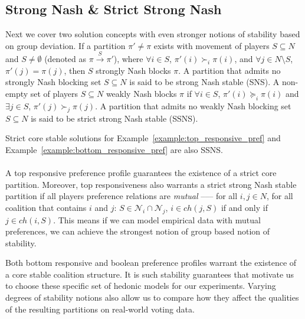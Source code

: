 \subsection{Strong Nash \& Strict Strong Nash}
\label{subsec:strong_nash_strict_strong_nash}
Next we cover two solution concepts with even stronger notions of stability
based on group deviation.
If a partition $\pi' \neq \pi$ exists with movement of players $S \subseteq N$
and $S \neq \emptyset$ (denoted as $\pi \xrightarrow{S} \pi'$), where
$\forall i \in S$, $\pi'(i) \succ_i \pi(i)$,
and $\forall j \in N\text{\textbackslash}S$, $\pi'(j) = \pi(j)$,
then $S$ strongly Nash blocks $\pi$.
A partition that admits no strongly Nash blocking set $S \subseteq N$ is said
to be strong Nash stable (SNS).
A non-empty set of players $S \subseteq N$ weakly Nash blocks $\pi$ if
$\forall i \in S$, $\pi'(i) \succeq_i \pi(i)$ and $\exists j \in S$,
$\pi'(j) \succ_j \pi(j)$.
A partition that admits no weakly Nash blocking set $S \subseteq N$ is said to
be strict strong Nash stable (SSNS).

Strict core stable solutions for Example~\ref{example:top_responsive_pref}
and Example~\ref{example:bottom_responsive_pref} are also SSNS.

\paragraph{}
A top responsive preference profile guarantees the existence of a strict core partition.
Moreover, top responsiveness also warrants a strict strong Nash stable partition
if all players preference relations are \textit{mutual} ––– for all $i, j \in N$,
for all coalition that contains $i$ and $j$:
$S \in \mathcal{N}_i \cap \mathcal{N}_j$, $i \in ch(j, S)$ if and only if
$j \in ch(i, S)$.
This means if we can model empirical data with mutual preferences,
we can achieve the strongest notion of group based notion of stability.

Both bottom responsive and boolean preference profiles warrant the existence of
a core stable coalition structure.
It is such stability guarantees that motivate us to choose these specific set
of hedonic models for our experiments.
Varying degrees of stability notions also allow us to compare how they affect
the qualities of the resulting partitions on real-world voting data.


